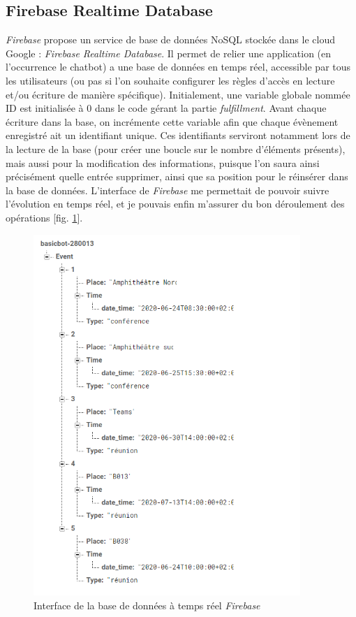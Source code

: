 \documentclass[stage2a]{tnreport} %
\begin{document}
\subsection{Firebase Realtime Database}

\emph{Firebase} propose un service de base de données NoSQL stockée dans le cloud Google : \emph{Firebase Realtime Database}. Il permet de relier une application (en l'occurrence le chatbot) a une base de données en temps réel, accessible par tous les utilisateurs (ou pas si l'on souhaite configurer les règles d'accès en lecture et/ou écriture de manière spécifique). Initialement, une variable globale nommée ID est initialisée à 0 dans le code gérant la partie \emph{fulfillment}. Avant chaque écriture dans la base, on incrémente cette variable afin que chaque évènement enregistré ait un identifiant unique. Ces identifiants serviront notamment lors de la lecture de la base (pour créer une boucle sur le nombre d'éléments présents), mais aussi pour la modification des informations, puisque l'on saura ainsi précisément quelle entrée supprimer, ainsi que sa position pour le réinsérer dans la base de données. L'interface de \emph{Firebase} me permettait de pouvoir suivre l'évolution en temps réel, et je pouvais enfin m'assurer du bon déroulement des opérations [fig. \ref{firebase}].\\

\begin{figure}[h!]
    \centering
    \includegraphics[width=0.9\textwidth]{figures/Firebase.png}
    \caption{Interface de la base de données à temps réel \emph{Firebase}}
    \label{firebase}
\end{figure}
\end{document}
